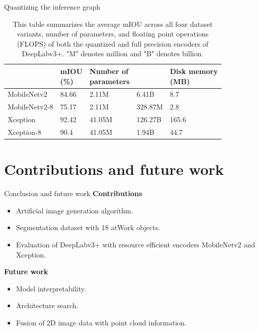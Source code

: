 \documentclass{beamer}
\begin{document}
\begin{frame}{Quantizing the inference graph}
	\begin{small}
		\begin{table}[h]
			\centering
			\begin{tabular}{|l|l|l|l|l|}
			\hline
			\makecell{\textbf{Encoder}} & \makecell{\textbf{mIOU} \\ \textbf{(\%)}} & \makecell{\textbf{Number of} \\ \textbf{parameters}} & \makecell{\textbf{FLOPS}} & \makecell{\textbf{Disk memory} \\ \textbf{(MB)}} \\ \hline
			MobileNetv2 & 84.66 & 2.11M & 6.41B & 8.7 \\ \hline
			MobileNetv2-8 & 75.17 & 2.11M & 328.87M & 2.8 \\ \hline
			Xception & 92.42 & 41.05M & 126.27B & 165.6 \\ \hline
			Xception-8 & 90.4 & 41.05M & 1.94B & 44.7 \\ \hline
			\end{tabular}
			\captionsetup{justification=centering,margin=0.2cm}
			\caption{This table summarizes the average mIOU across all four dataset variants, number of parameters, and floating point operations (FLOPS) of both the quantized and full precision encoders of DeepLabv3+. "M" denotes million and "B" denotes billion.}
			\label{Table:quantMetrics}
		\end{table}	
	\end{small}

\end{frame}


\section{Contributions and future work}

\begin{frame}{Conclusion and future work}
\textbf{Contributions}
	\begin{small}
		\begin{itemize}
			\item Artificial image generation algorithm.
			\item Segmentation dataset with 18 atWork objects.
			\item Evaluation of DeepLabv3+ with resource efficient encoders MobileNetv2 and Xception.
		\end{itemize}
	\end{small}
	
\vspace{5mm}
\textbf{Future work}
	\begin{small}
		\begin{itemize}
			\item Model interpretability.
			\item Architecture search.
			\item Fusion of 2D image data with point cloud information.
		\end{itemize}
	\end{small}

\end{frame}
\end{document}
